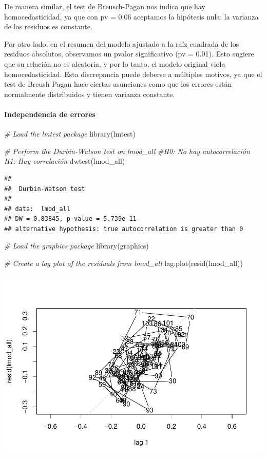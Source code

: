 \documentclass[
]{article}
\newenvironment{Shaded}{\begin{snugshade}}{\end{snugshade}}
\newcommand{\CommentTok}[1]{\textcolor[rgb]{0.56,0.35,0.01}{\textit{#1}}}
\newcommand{\FunctionTok}[1]{\textcolor[rgb]{0.00,0.00,0.00}{#1}}
\newcommand{\NormalTok}[1]{#1}
\begin{document}
De manera similar, el test de Breusch-Pagan nos indica que hay
homocedasticidad, ya que con pv = 0.06 aceptamos la hipótesis nula: la
varianza de los residuos es constante.

Por otro lado, en el resumen del modelo ajustado a la raíz cuadrada de
los residuos absolutos, observamos un pvalor significativo (pv = 0.01).
Esto sugiere que su relación no es aleatoria, y por lo tanto, el modelo
original viola homocedasticidad. Esta discrepancia puede deberse a
múltiples motivos, ya que el test de Breush-Pagan hace ciertas
asunciones como que los errores están normalmente distribuidos y tienen
varianza constante.

\hypertarget{independencia-de-errores}{%
\paragraph{Independencia de errores}\label{independencia-de-errores}}

\begin{Shaded}
\begin{Highlighting}[]
\CommentTok{\# Load the lmtest package}
\FunctionTok{library}\NormalTok{(lmtest)}

\CommentTok{\# Perform the Durbin{-}Watson test on lmod\_all}
\CommentTok{\#H0: No hay autocorrelación H1: Hay correlación}
\FunctionTok{dwtest}\NormalTok{(lmod\_all)}
\end{Highlighting}
\end{Shaded}

\begin{verbatim}
## 
##  Durbin-Watson test
## 
## data:  lmod_all
## DW = 0.83845, p-value = 5.739e-11
## alternative hypothesis: true autocorrelation is greater than 0
\end{verbatim}

\begin{Shaded}
\begin{Highlighting}[]
\CommentTok{\# Load the graphics package}
\FunctionTok{library}\NormalTok{(graphics)}

\CommentTok{\# Create a lag plot of the residuals from lmod\_all}
\FunctionTok{lag.plot}\NormalTok{(}\FunctionTok{resid}\NormalTok{(lmod\_all))}
\end{Highlighting}
\end{Shaded}

\includegraphics{code_files/figure-latex/unnamed-chunk-19-1.pdf}
\end{document}
